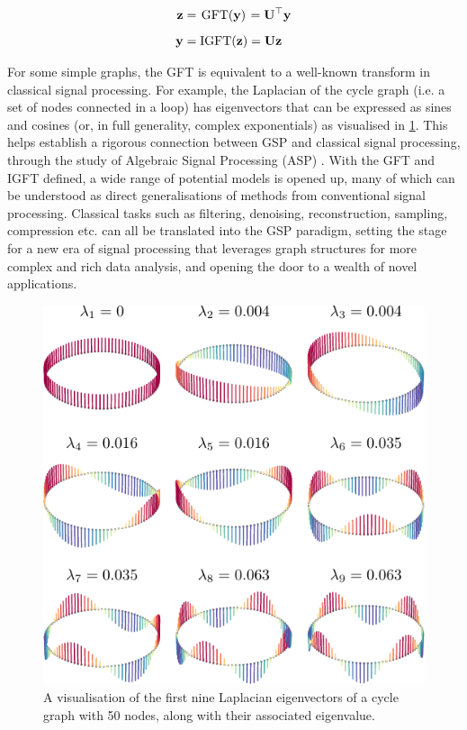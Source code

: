 \begin{align}
    \mathbf{z} &= \mkern 2mu \text{GFT}(\mathbf{y}) \mkern 2mu = \mathbf{U}^\top \mathbf{y} \\[0.2cm]
    \mathbf{y} &= \text{IGFT}(\mathbf{z})  = \mathbf{U} \mathbf{z}
\end{align}

For some simple graphs, the GFT is equivalent to a well-known transform in classical signal processing. For example, the Laplacian of the cycle graph (i.e. a set of nodes connected in a loop) has eigenvectors that can be expressed as sines and cosines (or, in full generality, complex exponentials) as visualised in \cref{fig:cycle_eighs}. This helps establish a rigorous connection between GSP and classical signal processing, through the study of Algebraic Signal Processing (ASP) \citep{Puschel2003, Sandryhaila2013}. With the GFT and IGFT defined, a wide range of potential models is opened up, many of which can be understood as direct generalisations of methods from conventional signal processing. Classical tasks such as filtering, denoising, reconstruction, sampling, compression etc. can all be translated into the GSP paradigm, setting the stage for a new era of signal processing that leverages graph structures for more complex and rich data analysis, and opening the door to a wealth of novel applications.

\begin{figure}[t]
	\centering
		\includegraphics[width=0.65\linewidth]{Figures/loop_plot.pdf}
        \caption[A visualisation of the Laplacian eigenvectors of the cycle graph]{A visualisation of the first nine Laplacian eigenvectors of a cycle graph with 50 nodes, along with their associated eigenvalue.}
	\label{fig:cycle_eighs}
\end{figure}


